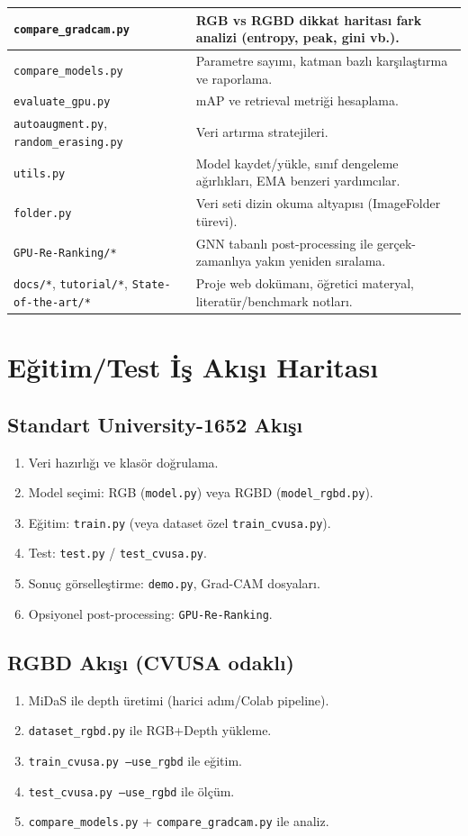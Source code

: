 \documentclass[11pt,a4paper]{article}
\begin{document}
\begin{longtable}{|p{}|p{}|}
\hline
\texttt{compare\_gradcam.py} & RGB vs RGBD dikkat haritası fark analizi (entropy, peak, gini vb.). \\
\hline
\texttt{compare\_models.py} & Parametre sayımı, katman bazlı karşılaştırma ve raporlama. \\
\hline
\texttt{evaluate\_gpu.py} & mAP ve retrieval metriği hesaplama. \\
\hline
\texttt{autoaugment.py}, \texttt{random\_erasing.py} & Veri artırma stratejileri. \\
\hline
\texttt{utils.py} & Model kaydet/yükle, sınıf dengeleme ağırlıkları, EMA benzeri yardımcılar. \\
\hline
\texttt{folder.py} & Veri seti dizin okuma altyapısı (ImageFolder türevi). \\
\hline
\texttt{GPU-Re-Ranking/*} & GNN tabanlı post-processing ile gerçek-zamanlıya yakın yeniden sıralama. \\
\hline
\texttt{docs/*}, \texttt{tutorial/*}, \texttt{State-of-the-art/*} & Proje web dokümanı, öğretici materyal, literatür/benchmark notları. \\
\hline
\end{longtable}

\section{Eğitim/Test İş Akışı Haritası}
\subsection*{Standart University-1652 Akışı}
\begin{enumerate}
    \item Veri hazırlığı ve klasör doğrulama.
    \item Model seçimi: RGB (\texttt{model.py}) veya RGBD (\texttt{model\_rgbd.py}).
    \item Eğitim: \texttt{train.py} (veya dataset özel \texttt{train\_cvusa.py}).
    \item Test: \texttt{test.py} / \texttt{test\_cvusa.py}.
    \item Sonuç görselleştirme: \texttt{demo.py}, Grad-CAM dosyaları.
    \item Opsiyonel post-processing: \texttt{GPU-Re-Ranking}.
\end{enumerate}

\subsection*{RGBD Akışı (CVUSA odaklı)}
\begin{enumerate}
    \item MiDaS ile depth üretimi (harici adım/Colab pipeline).
    \item \texttt{dataset\_rgbd.py} ile RGB+Depth yükleme.
    \item \texttt{train\_cvusa.py --use\_rgbd} ile eğitim.
    \item \texttt{test\_cvusa.py --use\_rgbd} ile ölçüm.
    \item \texttt{compare\_models.py} + \texttt{compare\_gradcam.py} ile analiz.
\end{enumerate}
\end{document}
